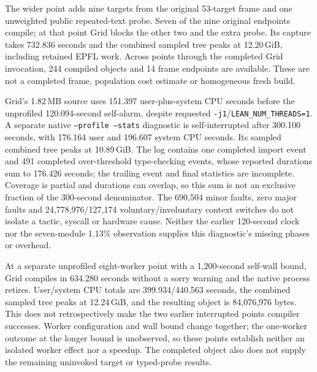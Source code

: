 \documentclass[10pt,twocolumn]{article}
\begin{document}
The wider point adds nine targets from the original 53-target frame and
one unweighted public repeated-text probe. Seven of the nine original
endpoints compile; at that point Grid blocks the other two and the extra probe.
Its capture takes 732.836 seconds and the combined sampled tree peaks at
12.20\,GiB, including retained EPFL work. Across points through the completed Grid invocation,
244 compiled objects and 14 frame endpoints are available. These are not
a completed frame, population cost estimate or homogeneous fresh build.

Grid's 1.82\,MB source uses 151.397 user-plus-system CPU seconds before
the unprofiled 120.094-second self-alarm, despite requested
\texttt{-j1}/\texttt{LEAN\_NUM\_THREADS=1}. A separate native
\texttt{--profile --stats} diagnostic is self-interrupted after
300.100 seconds, with 176.164 user and 196.607 system CPU seconds.
Its sampled combined tree peaks at 10.89\,GiB. The log contains one completed
import event and 491 completed over-threshold type-checking events, whose
reported durations sum to 176.426 seconds; the trailing event and final
statistics are incomplete. Coverage is partial and durations can overlap,
so this sum is not an exclusive fraction of the 300-second denominator.
The 690,504 minor faults, zero major faults and 24,778,976/127,174
voluntary/involuntary context switches do not isolate a tactic, syscall
or hardware cause. Neither the earlier 120-second clock nor the seven-module
1.13\% observation supplies this diagnostic's missing phases or overhead.

At a separate unprofiled eight-worker point with a 1,200-second self-wall
bound, Grid compiles in 634.280 seconds without a sorry warning and the
native process retires. User/system CPU totals are 399.934/440.563 seconds,
the combined sampled tree peaks at 12.24\,GiB, and the resulting object is
84,076,976 bytes. This does not retrospectively make the two earlier
interrupted points compiler successes. Worker configuration and wall bound
change together; the one-worker outcome at the longer bound is unobserved,
so these points establish neither an isolated worker effect nor a speedup.
The completed object also does not supply the remaining uninvoked target
or typed-probe results.
\end{document}
